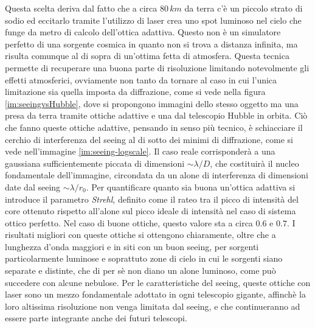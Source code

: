 Questa scelta deriva dal fatto che a circa $80\, km$ da terra c'è un piccolo strato di sodio ed eccitarlo tramite l'utilizzo di laser crea uno spot luminoso nel cielo che funge da metro di calcolo dell'ottica adattiva. Questo non è un simulatore perfetto di una sorgente cosmica in quanto non si trova a distanza infinita, ma risulta comunque al di sopra di un'ottima fetta di atmosfera. Questa tecnica permette di recuperare una buona parte di risoluzione limitando notevolmente gli effetti atmosferici, ovviamente non tanto da tornare al caso in cui l'unica limitazione sia quella imposta da diffrazione, come si vede nella figura \ref{im:seeingvsHubble}, dove si propongono immagini dello stesso oggetto ma una presa da terra tramite ottiche adattive e una dal telescopio Hubble in orbita. Ciò che fanno queste ottiche adattive, pensando in senso più tecnico, è schiacciare il cerchio di interferenza del seeing al di sotto dei minimi di diffrazione, come si vede nell'immagine \ref{im:seeing-logscale}. Il caso reale corrisponderà a una gaussiana sufficientemente piccata di dimensioni $\sim \lambda/D$, che costituirà il nucleo fondamentale dell'immagine, circondata da un alone di interferenza di dimensioni date dal seeing $\sim \lambda/r_0$. Per quantificare quanto sia buona un'ottica adattiva si introduce il parametro \textit{Strehl}, definito come il rateo tra il picco di intensità del core ottenuto rispetto all'alone sul picco ideale di intensità nel caso di sistema ottico perfetto. Nel caso di buone ottiche, questo valore sta a circa $0.6$ e $0.7$. I risultati migliori con queste ottiche si ottengono chiaramente, oltre che a lunghezza d'onda maggiori e in siti con un buon seeing, per sorgenti particolarmente luminose e soprattuto zone di cielo in cui le sorgenti siano separate e distinte, che di per sè non diano un alone luminoso, come può succedere con alcune nebulose. Per le caratteristiche del seeing, queste ottiche con laser sono un mezzo fondamentale adottato in ogni telescopio gigante, affinchè la loro altissima risoluzione non venga limitata dal seeing, e che continueranno ad essere parte integrante anche dei futuri telescopi.